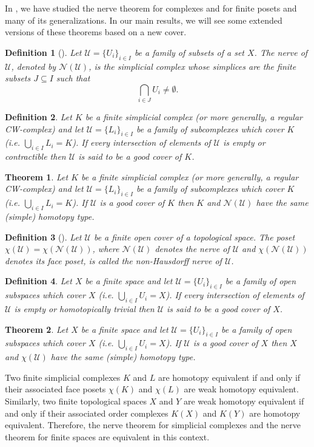 \documentclass[12pt,a4paper,twoside, reqno, tbtags]{article}
\numberwithin{equation}{section}
\newtheorem{theorem}{Theorem}[section]
\newtheorem{definition}{Definition}[section]
\begin{document}
    \noindent In \cite{Ximena}, we have studied the nerve theorem for complexes and for finite posets and many of its generalizations. In our main results, we will see some extended versions of these theorems based on a new cover.
\begin{definition}[\cite{Ximena}]\label{i}
	Let $\mathcal{U} = \{U_i\}_{i \in I}$ be a family of subsets of a set $X$. The \emph{nerve} of $\mathcal{U}$, denoted by $\mathcal{N}(\mathcal{U})$, is the simplicial complex whose simplices are the finite subsets $J \subseteq I$ such that
	\[
	\bigcap_{i \in J} U_i \neq \emptyset.
	\]
\end{definition}
\begin{definition}\cite{Ximena}\label{j}
     Let $K$ be a finite simplicial complex (or more generally, a regular CW-complex) and let $\mathcal{U} =\{L_i \}_{i\in I}$ be a family of subcomplexes which cover $K$ (i.e. $\bigcup_{i\in I} L_i = K$). If every intersection of elements of $\mathcal{U}$ is empty or contractible then $\mathcal{U}$ is said to be a good cover of $K$.
\end{definition}
\begin{theorem}\cite{Ximena}\label{k}
    Let $K$ be a finite simplicial complex (or more generally, a regular CW-complex) and let $\mathcal{U} =\{L_i \}_{i\in I}$ be a family of subcomplexes which cover $K$ (i.e. $\bigcup_{i\in I} L_i = K$). If $\mathcal{U}$ is a good cover of $K$ then $K$ and $\mathcal{N}(\mathcal{U})$ have the same (simple) homotopy type.
\end{theorem}
\begin{definition}[\cite{Ximena}]\label{l}
	Let $\mathcal{U}$ be a finite open cover of a topological space. The poset $\chi(\mathcal{U}) = \chi(\mathcal{N}(\mathcal{U}))$, where $\mathcal{N}(\mathcal{U})$ denotes the nerve of $\mathcal{U}$ and $\chi(\mathcal{N}(\mathcal{U}))$ denotes its face poset, is called the \emph{non-Hausdorff nerve} of $\mathcal{U}$.
\end{definition}
\begin{definition}\cite{Ximena}\label{m}
     Let $X$ be a finite space and let $\mathcal{U} =\{U_i \}_{i\in I}$ be a family of open subspaces which cover $X$ (i.e. $\bigcup_{i\in I} U_i = X$). If every intersection of elements of $\mathcal{U}$ is empty or homotopically trivial then $\mathcal{U}$ is said to be a good cover of $X$.
\end{definition}
\begin{theorem}\cite{Ximena}\label{n}
    Let $X$ be a finite space and let $\mathcal{U} =\{U_i \}_{i\in I}$ be a family of open subspaces which cover $X$ (i.e. $\bigcup_{i\in I} U_i = X$). If $\mathcal{U}$ is a good cover of $X$ then $X$ and $\chi(\mathcal{U})$ have the same (simple) homotopy type.
\end{theorem}
    \noindent Two finite simplicial complexes $K$ and $L$ are homotopy equivalent if and only if their associated face posets $\chi(K)$ and $\chi(L)$ are weak homotopy equivalent. Similarly, two finite topological spaces $X$ and $Y$ are weak homotopy equivalent if and only if their associated order complexes $K(X)$ and $K(Y)$ are homotopy equivalent. Therefore, the nerve theorem for simplicial complexes and the nerve theorem for finite spaces are equivalent in this context.
    
\end{document}
